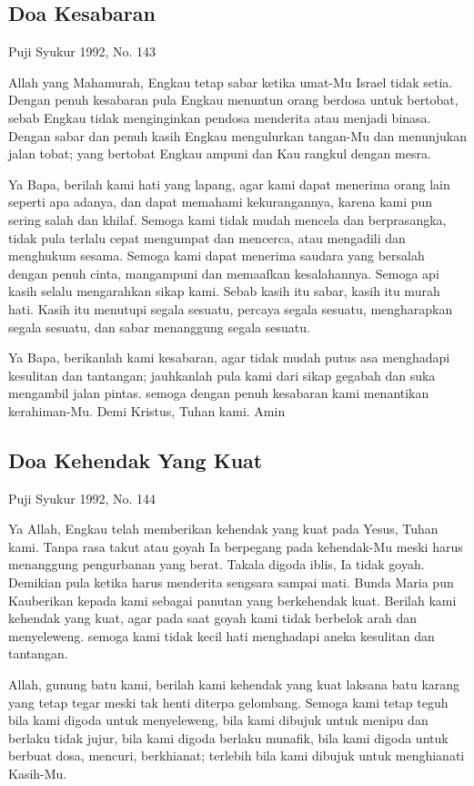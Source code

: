 \documentclass[titlepage,11pt,openany]{scrbook}
\newcommand{\ps}[2][\numexpr\value{subsection}+1\relax]{%
\setcounter{subsection}{\numexpr#1-1\relax}
\subsection{#2}
}
\begin{document}
 

\ps{Doa Kesabaran}
Puji Syukur 1992, No. 143

Allah yang Mahamurah, Engkau tetap sabar ketika umat-Mu Israel tidak setia. Dengan penuh kesabaran pula Engkau menuntun orang berdosa untuk bertobat, sebab Engkau tidak menginginkan pendosa menderita atau menjadi binasa. Dengan sabar dan penuh kasih Engkau mengulurkan tangan-Mu dan menunjukan jalan tobat; yang bertobat Engkau ampuni dan Kau rangkul dengan mesra.

Ya Bapa, berilah kami hati yang lapang, agar kami dapat menerima orang lain seperti apa adanya, dan dapat memahami kekurangannya, karena kami pun sering salah dan khilaf. Semoga kami tidak mudah mencela dan berprasangka, tidak pula terlalu cepat mengumpat dan mencerca, atau mengadili dan menghukum sesama. Semoga kami dapat menerima saudara yang bersalah dengan penuh cinta, mangampuni dan memaafkan kesalahannya. Semoga api kasih selalu mengarahkan sikap kami. Sebab kasih itu sabar, kasih itu murah hati. Kasih itu menutupi segala sesuatu, percaya segala sesuatu, mengharapkan segala sesuatu, dan sabar menanggung segala sesuatu.

Ya Bapa, berikanlah kami kesabaran, agar tidak mudah putus asa menghadapi kesulitan dan tantangan; jauhkanlah pula kami dari sikap gegabah dan suka mengambil jalan pintas. semoga dengan penuh kesabaran kami menantikan kerahiman-Mu. Demi Kristus, Tuhan kami. Amin

 

\ps{Doa Kehendak Yang Kuat}
Puji Syukur 1992, No. 144

Ya Allah, Engkau telah memberikan kehendak yang kuat pada Yesus, Tuhan kami. Tanpa rasa takut atau goyah Ia berpegang pada kehendak-Mu meski harus menanggung pengurbanan yang berat. Takala digoda iblis, Ia tidak goyah. Demikian pula ketika harus menderita sengsara sampai mati. Bunda Maria pun Kauberikan kepada kami sebagai panutan yang berkehendak kuat. Berilah kami kehendak yang kuat, agar pada saat goyah kami tidak berbelok arah dan menyeleweng. semoga kami tidak kecil hati menghadapi aneka kesulitan dan tantangan.

Allah, gunung batu kami, berilah kami kehendak yang kuat laksana batu karang yang tetap tegar meski tak henti diterpa gelombang. Semoga kami tetap teguh bila kami digoda untuk menyeleweng, bila kami dibujuk untuk menipu dan berlaku tidak jujur, bila kami digoda berlaku munafik, bila kami digoda untuk berbuat dosa, mencuri, berkhianat; terlebih bila kami dibujuk untuk menghianati Kasih-Mu.
\end{document}
